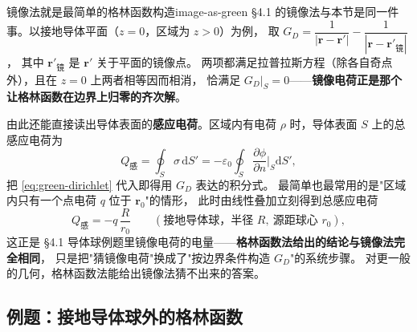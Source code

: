 \documentclass[11pt,a4paper,openany,oneside]{book}
\newcommand{\diff}{\mathrm{d}}
\newcommand{\eps}{\varepsilon}
\newcommand{\vect}[1]{\bm{#1}}
\begin{document}
\begin{insight}{镜像法就是最简单的格林函数构造}{image-as-green}
§4.1 的镜像法与本节是同一件事。以接地导体平面（$z=0$，区域为 $z>0$）为例，
取 $G_D = \dfrac{1}{|\vect r - \vect r'|} - \dfrac{1}{|\vect r - \vect r'_{\text{镜}}|}$，
其中 $\vect r'_{\text{镜}}$ 是 $\vect r'$ 关于平面的镜像点。
两项都满足拉普拉斯方程（除各自奇点外），且在 $z=0$ 上两者相等因而相消，
恰满足 $G_D\big|_{S} = 0$——\textbf{镜像电荷正是那个让格林函数在边界上归零的齐次解}。

由此还能直接读出导体表面的\textbf{感应电荷}。区域内有电荷 $\rho$ 时，导体表面
$S$ 上的总感应电荷为
\[
Q_{\text{感}} = \oint_S \sigma\,\diff S'
= -\eps_0\oint_S \frac{\partial\phi}{\partial n}\bigg|_S \diff S',
\]
把 \eqref{eq:green-dirichlet} 代入即得用 $G_D$ 表达的积分式。
最简单也最常用的是"区域内只有一个点电荷 $q$ 位于 $\vect r_0$"的情形，
此时由线性叠加立刻得到总感应电荷
\[
Q_{\text{感}} = -q\,\frac{R}{r_0}\qquad(\text{接地导体球，半径 } R,\ \text{源距球心 } r_0),
\]
这正是 §4.1 导体球例题里镜像电荷的电量——\textbf{格林函数法给出的结论与镜像法完全相同}，
只是把"猜镜像电荷"换成了"按边界条件构造 $G_D$"的系统步骤。
对更一般的几何，格林函数法能给出镜像法猜不出来的答案。
\end{insight}

\subsection{例题：接地导体球外的格林函数}
\end{document}

